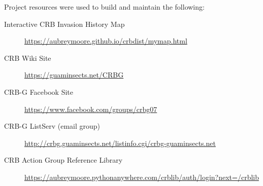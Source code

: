 \documentclass[12pt,letterpaper,english,bibliography=totocnumbered,abstract=on]{scrartcl}
\begin{document}
Project resources were used to build and maintain the following:
\begin{description}
	\item[Interactive CRB Invasion History Map] \footnotesize{\url{https://aubreymoore.github.io/crbdist/mymap.html}}
	\item[CRB Wiki Site] \footnotesize{\url{https://guaminsects.net/CRBG}}
	\item[CRB-G Facebook Site] \footnotesize{\url{https://www.facebook.com/groups/crbg07}}
	\item[CRB-G ListServ (email group)] \footnotesize{\url{http://crbg.guaminsects.net/listinfo.cgi/crbg-guaminsects.net}}
	\item[CRB Action Group Reference Library] \footnotesize{\url{https://aubreymoore.pythonanywhere.com/crblib/auth/login?next=/crblib}}
\end{description}

\newpage

%
%
%
%
%
%
%
%
%
%
%
%
%
%
\clearpage
\printbibliography[heading=bibintoc]
\end{document}

